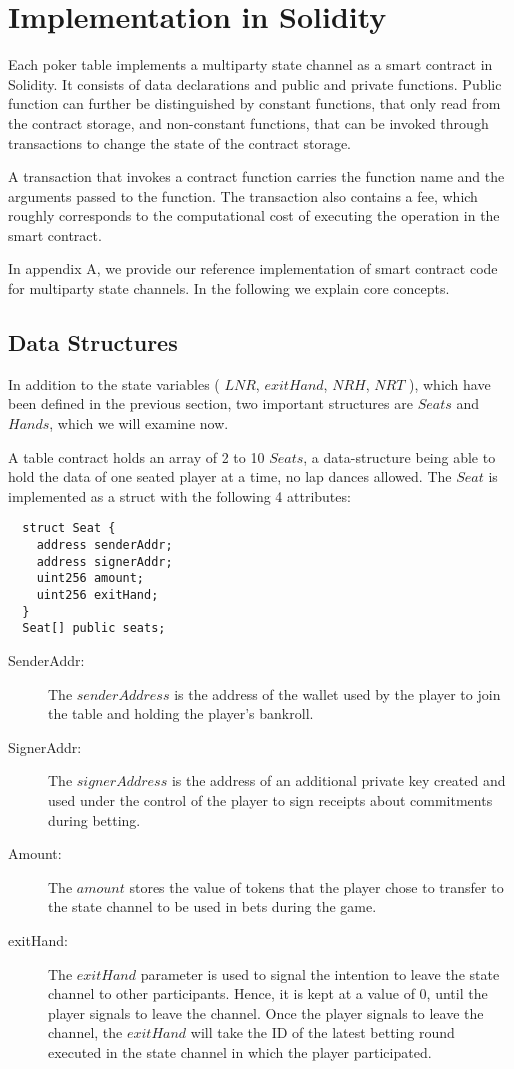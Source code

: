 \section{Implementation in Solidity}

Each poker table implements a multiparty state channel as a smart contract in Solidity. It consists of data declarations and public and private functions. Public function can further be distinguished by constant functions, that only read from the contract storage, and non-constant functions, that can be invoked through transactions to change the state of the contract storage.

A transaction that invokes a contract function carries the function name and the arguments passed to the function. The transaction also contains a fee, which roughly corresponds to the computational cost of executing the operation in the smart contract.

In appendix A, we provide our reference implementation of smart contract code for multiparty state channels. In the following we explain core concepts.

\subsection{Data Structures}

In addition to the state variables ( \(LNR\), \(exitHand\), \(NRH\), \(NRT\) ), which have been defined in the previous section, two important structures are \(Seats\) and \(Hands\), which we will examine now.

A table contract holds an array of 2 to 10 \(Seats\), a data-structure being able to hold the data of one seated player at a time, no lap dances allowed. The \(Seat\) is implemented as a struct with the following 4 attributes:

\begin{verbatim}
  struct Seat {
    address senderAddr;
    address signerAddr;
    uint256 amount;
    uint256 exitHand;
  }
  Seat[] public seats;
\end{verbatim}

\begin{description}
\item[SenderAddr:] The \(senderAddress\) is the address of the wallet used by the player to join the table and holding the player's bankroll.
\item[SignerAddr:] The \(signerAddress\) is the address of an additional private key created and used under the control of the player to sign receipts about commitments during betting.
\item[Amount:] The \(amount\) stores the value of tokens that the player chose to transfer to the state channel to be used in bets during the game.
\item[exitHand:] The \(exitHand\) parameter is used to signal the intention to leave the state channel to other participants. Hence, it is kept at a value of 0, until the player signals to leave the channel. Once the player signals to leave the channel, the \(exitHand\) will take the ID of the latest betting round executed in the state channel in which the player participated.
\end{description}


